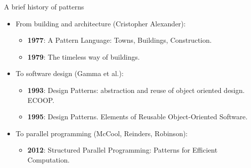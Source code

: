 \begin{frame}[t]{A brief history of patterns}
\begin{itemize}
\item From building and architecture (Cristopher Alexander):
\begin{itemize}
  \item \textbf{1977}: A Pattern Language: Towns, Buildings, Construction.
  \item \textbf{1979}: The timeless way of buildings.
\end{itemize}
\vfill
\item To software design (Gamma et al.):
\begin{itemize}
  \item \textbf{1993}: Design Patterns: abstraction and reuse of object oriented design. ECOOP.
  \item \textbf{1995}: Design Patterns. Elements of Reusable Object-Oriented Software.
\end{itemize}
\vfill
\item To parallel programming (McCool, Reinders, Robinson):
\begin{itemize}
  \item \textbf{2012}: Structured Parallel Programming: Patterns for Efficient Computation.
\end{itemize}
\end{itemize}
\end{frame}
